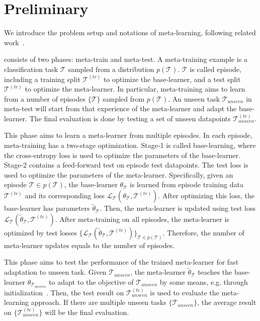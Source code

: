 \section{Preliminary}
\label{sec_preli}

We introduce the problem setup and notations of meta-learning, following related work~\cite{VinyalsBLKW16, RaviICLR2017, FinnAL17, OreshkinNIPS18}.

 consists of two phases: meta-train and meta-test. A meta-training example is a classification task $\mathcal{T}$ sampled from a distribution $p(\mathcal{T})$. 
%
$\mathcal{T}$ is called episode, including a training split $\mathcal{T}^{(tr)}$ to optimize the base-learner, and a test split $\mathcal{T}^{(te)}$ to optimize the meta-learner. 
%
In particular, meta-training aims to learn from a number of episodes $\{\mathcal{T}\}$ sampled from $p(\mathcal{T})$.
%
%
An unseen task $\mathcal{T}_{unseen}$ in meta-test will start from that experience of the meta-learner and adapt the base-learner. The final evaluation is done by testing a set of unseen datapoints $\mathcal{T}^{(te)}_{unseen}$.
%


%
This phase aims to learn a meta-learner from multiple episodes.
In each episode, meta-training has a two-stage optimization. 
%
Stage-1 is called base-learning, where the cross-entropy loss is used to optimize the parameters of the base-learner.
%
Stage-2 contains a feed-forward test on episode test datapoints. The test loss is used to optimize the parameters of the meta-learner.
%
Specifically, given an episode $\mathcal{T} \in p(\mathcal{T})$, the base-learner $\theta_\mathcal{T}$ is learned from episode training data $\mathcal{T}^{(tr)}$ and its corresponding loss $\mathcal{L}_{\mathcal{T}}(\theta_\mathcal{T}, \mathcal{T}^{(tr)})$. 
%
After optimizing this loss, the base-learner has parameters $\tilde{\theta}_\mathcal{T}$. 
%
Then, the meta-learner is updated using test loss $\mathcal{L}_{\mathcal{T}}(\tilde{\theta}_\mathcal{T}, \mathcal{T}^{(te)})$. 
%
After meta-training on all episodes, the meta-learner is optimized by test losses $\{\mathcal{L}_{\mathcal{T}}(\tilde{\theta}_\mathcal{T}, \mathcal{T}^{(te)})\}_{\mathcal{T} \in p(\mathcal{T})}$. Therefore, the number of meta-learner updates equals to the number of episodes.

This phase aims to test the performance of the trained meta-learner for fast adaptation to unseen task.
Given $\mathcal{T}_{unseen}$, the meta-learner $\tilde{\theta}_\mathcal{T}$ teaches the base-learner $\theta_{\mathcal{T}_{unseen}}$ to adapt to the objective of $\mathcal{T}_{unseen}$ by some means, e.g. through initialization~\cite{FinnAL17}. 
%
Then, the test result on $\mathcal{T}^{(te)}_{unseen}$ is used to evaluate the meta-learning approach. 
%
If there are multiple unseen tasks $\{\mathcal{T}_{unseen}\}$, the average result on $\{\mathcal{T}^{(te)}_{unseen}\}$ will be the final evaluation.
